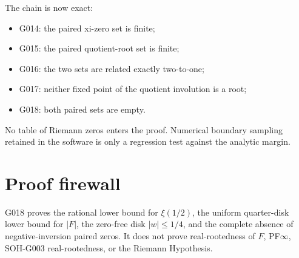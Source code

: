 The chain is now exact:
\begin{itemize}
 \item G014: the paired xi-zero set is finite;
 \item G015: the paired quotient-root set is finite;
 \item G016: the two sets are related exactly two-to-one;
 \item G017: neither fixed point of the quotient involution is a root;
 \item G018: both paired sets are empty.
\end{itemize}

No table of Riemann zeros enters the proof. Numerical boundary sampling retained in the software is only a regression test against the analytic margin.

\section{Proof firewall}

G018 proves the rational lower bound for $\xi(1/2)$, the uniform quarter-disk lower bound for $|F|$, the zero-free disk $|w|\le1/4$, and the complete absence of negative-inversion paired zeros. It does not prove real-rootedness of $F$, PF$\infty$, SOH-G003 real-rootedness, or the Riemann Hypothesis.
